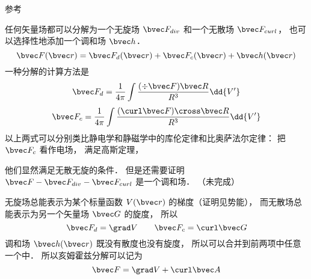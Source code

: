 
\begin{issues}
\issueDraft
\end{issues}

参考 \cite{GriffE}

任何矢量场都可以分解为一个无旋场 $\bvec F_{div}$ 和一个无散场 $\bvec F_{curl}$， 也可以选择性地添加一个调和场 $\bvec h$．%
\begin{equation}
\bvec F(\bvec r) = \bvec F_{d}(\bvec r) + \bvec F_{c}(\bvec r) + \bvec h(\bvec r)
\end{equation}
一种分解的计算方法是
\begin{equation}\label{HelmTh_eq1}
\bvec F_{d} = \frac{1}{4\pi}\int \frac{(\div \bvec F)\bvec R}{R^3} \dd{V'}
\end{equation}
\begin{equation}
\bvec F_{c} = \frac{1}{4\pi}\int \frac{(\curl \bvec F)\cross \bvec R}{R^3} \dd{V'}
\end{equation}
以上两式可以分别类比静电学和静磁学中的库伦定律和比奥萨法尔定律： 把 $\bvec F_c$ 看作电场， 满足高斯定理， 

 他们显然满足无散无旋的条件． 但是还需要证明 $\bvec F - \bvec F_{div} - \bvec F_{curl}$ 是一个调和场．
（未完成）

无旋场总能表示为某个标量函数 $V(\bvec r)$ 的梯度（证明见势能）， 而无散场总能表示为另一个矢量场 $\bvec G$ 的旋度， 所以
\begin{equation}
\bvec F_{d} = \grad V\qquad \bvec F_{c} = \curl \bvec G
\end{equation}
调和场 $\bvec h(\bvec r)$ 既没有散度也没有旋度， 所以可以合并到前两项中任意一个中． 所以亥姆霍兹分解可以记为
\begin{equation}
\bvec F = \grad V + \curl \bvec A
\end{equation}



